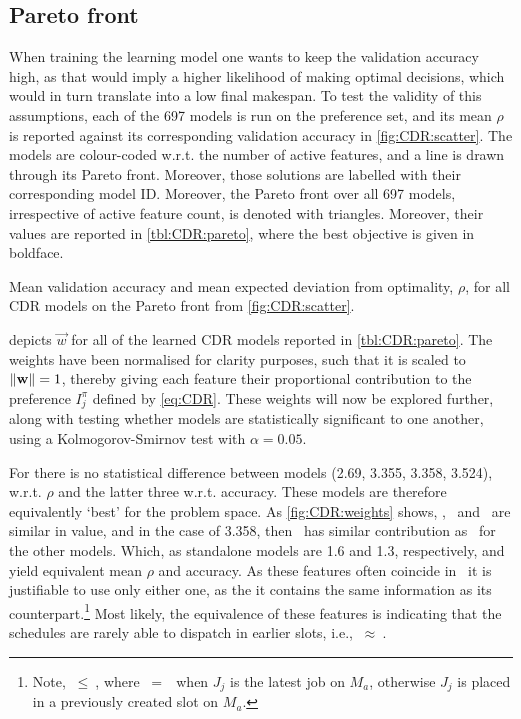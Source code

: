 \subsection{Pareto front}\label{sec:CDR:pareto}
When training the learning model one wants to keep the validation accuracy 
high, as that would imply a higher likelihood of making optimal decisions, 
which would in turn translate into a low final makespan. To test the validity 
of this assumptions, each of the 697 models is run on the preference set, and 
its mean $\rho$ is reported against its corresponding validation accuracy in 
\cref{fig:CDR:scatter}. The models are colour-coded w.r.t. the number of active 
features, and a line is drawn through its Pareto front. Moreover, those 
solutions are labelled with their corresponding model ID. Moreover, the Pareto 
front over all 697 models, irrespective of active feature count, is denoted 
with triangles. Moreover, their values are reported in \cref{tbl:CDR:pareto}, 
where the best objective is given in boldface. 

\begin{table}[p]
  \caption{Mean validation accuracy and mean expected deviation from 
    optimality, $\rho$, for all CDR models on the Pareto front from 
    \cref{fig:CDR:scatter}.}\label{tbl:CDR:pareto}
  
\end{table}

 depicts $\vec{w}$ for all of the learned CDR models 
reported in \cref{tbl:CDR:pareto}. 
The weights have been normalised for clarity purposes, such that it is scaled 
to $\lVert\mathbf{w}\rVert=1$, thereby giving each feature their proportional 
contribution to the preference $I_j^{\pi}$ defined by \cref{eq:CDR}. 
These weights will now be explored further, along with testing whether models 
are statistically significant to one another, using a 
Kolmogorov-Smirnov test with $\alpha=0.05$.

For   there is no statistical difference between models (2.69, 
3.355, 3.358, 3.524), w.r.t. $\rho$ and the latter three w.r.t. 
accuracy. These models are therefore equivalently `best' for the problem space.
As \cref{fig:CDR:weights} shows, \phiendTime, \phijobWrm\ and \phimacWrm\ are 
similar in value, and in the case of 3.358, then \phimacFree\ has similar 
contribution as \phiendTime\ for the other models. 
Which, as standalone models are 1.6 and 1.3, respectively, and yield 
equivalent mean $\rho$ and accuracy.
As these features often coincide in \jsp\, it is justifiable to use only 
either one, as the it contains the same information as its 
counterpart.\footnote{Note, \phiendTime$~\leq~$\phimacFree, where
  \phiendTime$~=~$\phimacFree\ when $J_j$ is the latest job on $M_a$, 
  otherwise $J_j$ is placed in a previously created slot on $M_a$.}
Most likely, the equivalence of these features is indicating that the 
schedules are rarely able to dispatch in earlier slots, i.e., 
\phiendTime$~\approx~$\phimacFree. 


